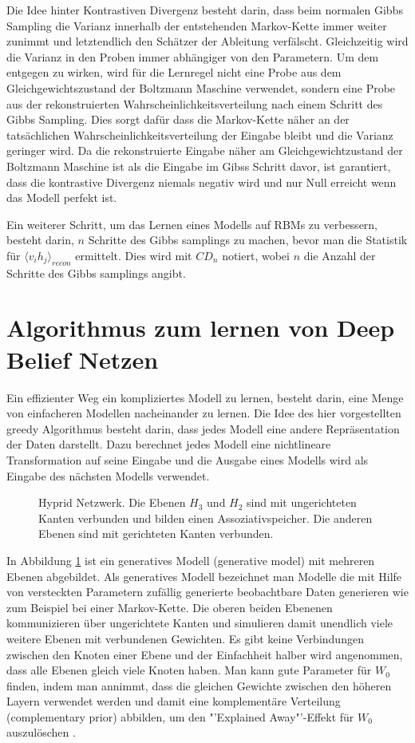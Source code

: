\documentclass[12pt]{article}
\begin{document}
Die Idee hinter Kontrastiven Divergenz besteht darin, dass beim normalen Gibbs Sampling die Varianz innerhalb der entstehenden Markov-Kette immer weiter zunimmt und letztendlich den Schätzer der Ableitung verfälscht. Gleichzeitig wird die Varianz in den Proben immer abhängiger von den Parametern. Um dem entgegen zu wirken, wird für die Lernregel nicht eine Probe aus dem Gleichgewichtszustand der Boltzmann Maschine verwendet, sondern eine Probe aus der rekonstruierten Wahrscheinlichkeitsverteilung nach einem Schritt des Gibbs Sampling. Dies sorgt dafür dass die Markov-Kette näher an der tatsächlichen Wahrscheinlichkeitsverteilung der Eingabe bleibt und die Varianz geringer wird. Da die rekonstruierte Eingabe näher am Gleichgewichtzustand der Boltzmann Maschine ist als die Eingabe im Gibss Schritt davor, ist garantiert, dass die kontrastive Divergenz niemals negativ wird und nur Null erreicht wenn das Modell perfekt ist. \cite{digits}

Ein weiterer Schritt, um das Lernen eines Modells auf RBMs zu verbessern, besteht darin, $n$ Schritte des Gibbs samplings zu machen, bevor man die Statistik für $\langle v_i h_j \rangle_{recon}$ ermittelt. Dies wird mit $CD_n$ notiert, wobei $n$ die Anzahl der Schritte des Gibbs samplings angibt.

\section{Algorithmus zum lernen von Deep Belief Netzen}
Ein effizienter Weg ein kompliziertes Modell zu lernen, besteht darin, eine Menge von einfacheren Modellen nacheinander zu lernen. Die Idee des hier vorgestellten greedy Algorithmus besteht darin, dass jedes Modell eine andere Repräsentation der Daten darstellt. Dazu berechnet jedes Modell eine nichtlineare Transformation auf seine Eingabe und die Ausgabe eines Modells wird als Eingabe des nächsten Modells verwendet. 

\begin{figure}[H]
	\center
	
	\caption{Hyprid Netzwerk. Die Ebenen $H_3$ und $H_2$ sind mit ungerichteten Kanten verbunden und bilden einen Assoziativspeicher. Die anderen Ebenen sind mit gerichteten Kanten verbunden.}
	\label{Netz}
\end{figure}

In Abbildung \ref{Netz} ist ein generatives Modell (generative model)  mit mehreren Ebenen abgebildet. Als generatives Modell bezeichnet man Modelle die mit Hilfe von versteckten Parametern zufällig generierte beobachtbare Daten generieren wie zum Beispiel bei einer Markov-Kette. Die oberen beiden Ebenenen kommunizieren über ungerichtete Kanten und simulieren damit unendlich viele weitere Ebenen mit verbundenen Gewichten. Es gibt keine Verbindungen zwischen den Knoten einer Ebene und der Einfachheit halber wird angenommen, dass alle Ebenen gleich viele Knoten haben. Man kann gute Parameter für $W_0$ finden, indem man annimmt, dass die gleichen Gewichte zwischen den höheren Layern verwendet werden und damit eine komplementäre Verteilung (complementary prior) abbilden, um den "'Explained Away"'-Effekt für $W_0$ auszulöschen \cite{learning}.
\end{document}
